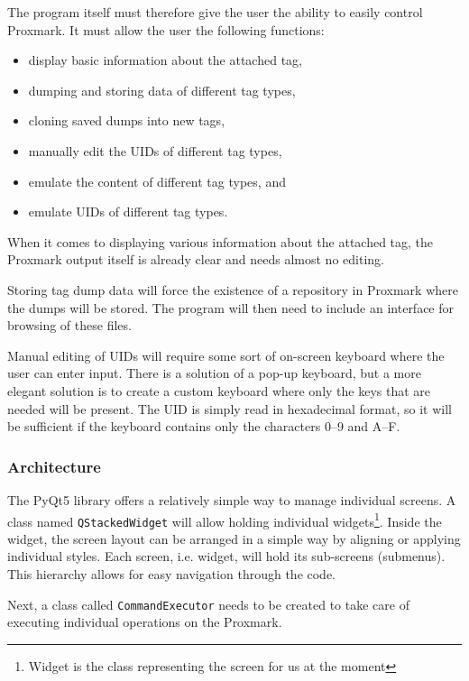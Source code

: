 The program itself must therefore give the user the ability to easily control Proxmark. It must allow the user the following functions:

\begin{itemize}
    \item display basic information about the attached tag,
    \item dumping and storing data of different tag types,
    \item cloning saved dumps into new tags,
    \item manually edit the UIDs of different tag types,
    \item emulate the content of different tag types, and
    \item emulate UIDs of different tag types.
\end{itemize}

When it comes to displaying various information about the attached tag, the Proxmark output itself is already clear and needs almost no editing.

Storing tag dump data will force the existence of a repository in Proxmark where the dumps will be stored. The program will then need to include an interface for browsing of these files.

Manual editing of UIDs will require some sort of on-screen keyboard where the user can enter input. There is a solution of a pop-up keyboard, but a more elegant solution is to create a custom keyboard where only the keys that are needed will be present. The UID is simply read in hexadecimal format, so it will be sufficient if the keyboard contains only the characters 0--9 and A--F.

\subsubsection{Architecture}

The PyQt5 library offers a relatively simple way to manage individual screens. A class named \texttt{QStackedWidget} will allow holding individual widgets\footnote{Widget is the class representing the screen for us at the moment}. Inside the widget, the screen layout can be arranged in a simple way by aligning or applying individual styles. Each screen, i.e. widget, will hold its sub-screens (submenus). This hierarchy allows for easy navigation through the code.

Next, a class called \texttt{CommandExecutor} needs to be created to take care of executing individual operations on the Proxmark.

